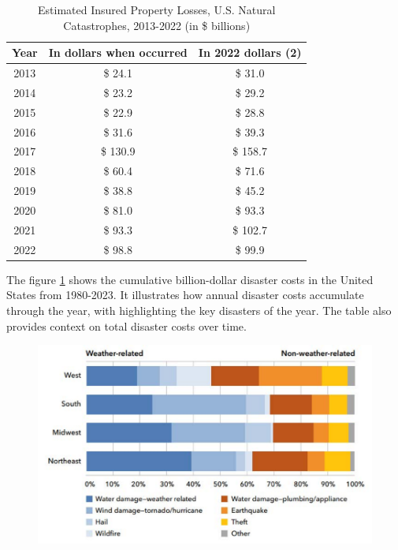 \documentclass[12pt]{article}
\begin{document}
\begin{table}[h]
    \caption{Estimated Insured Property Losses, U.S. Natural Catastrophes, 2013-2022 (in \$ billions)}
    \label{tab:insured_prop_losses}
    \centering
    \begin{tabular}{|c|c|c|}
        \hline
        Year & In dollars when occurred & In 2022 dollars (2) \\
        \hline
        2013 & \$ 24.1 & \$ 31.0 \\
        2014 & \$ 23.2 & \$ 29.2 \\
        2015 & \$ 22.9 & \$ 28.8 \\
        2016 & \$ 31.6 & \$ 39.3 \\
        2017 & \$ 130.9 & \$ 158.7 \\
        2018 & \$ 60.4 & \$ 71.6 \\
        2019 & \$ 38.8 & \$ 45.2 \\
        2020 & \$ 81.0 & \$ 93.3 \\
        2021 & \$ 93.3 & \$ 102.7 \\
        2022 & \$ 98.8 & \$ 99.9 \\
        \hline
    \end{tabular}
    \cite{iii}
\end{table}    
  

The figure \ref{fig:disaster_threats} shows the cumulative billion-dollar disaster costs in the United States from 1980-2023. It 
illustrates how annual disaster costs accumulate through the year, with highlighting the key disasters of the year. The table 
also provides context on total disaster costs over time.

\begin{figure}[ht]
    \centering
    \label{fig:disaster_threats}
    \includegraphics[width=0.8\linewidth]{NAIC HO threats.pdf}
    \cite{naic}
\end{figure}
\end{document}

